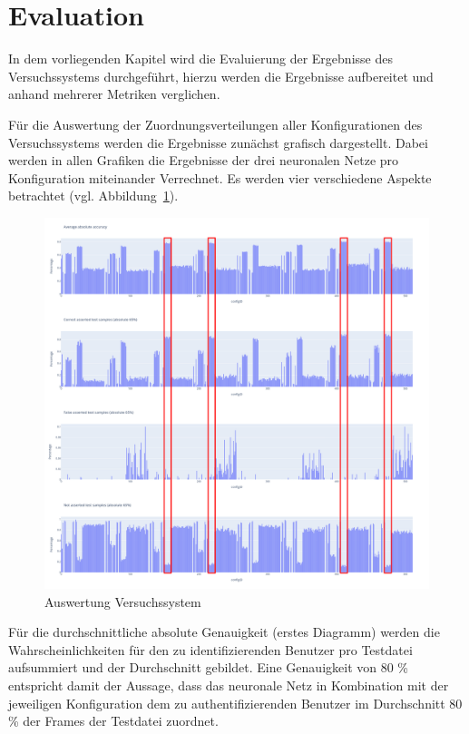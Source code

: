 \section{Evaluation} \label{sec:Evaluation}
In dem vorliegenden Kapitel wird die Evaluierung der Ergebnisse des Versuchssystems durchgeführt, hierzu werden die Ergebnisse aufbereitet und anhand mehrerer Metriken verglichen.

Für die Auswertung der Zuordnungsverteilungen aller Konfigurationen des Versuchssystems werden die Ergebnisse zunächst grafisch dargestellt.
Dabei werden in allen Grafiken die Ergebnisse der drei neuronalen Netze pro Konfiguration miteinander Verrechnet.
Es werden vier verschiedene Aspekte betrachtet (vgl. Abbildung~\ref{fig:AuswertungVersuchssystem}).
\begin{figure}[H]
    \centering
    \includegraphics[width=1\textwidth, keepaspectratio]{images/Auswertung.png}
    \caption{Auswertung Versuchssystem}
    \label{fig:AuswertungVersuchssystem}
\end{figure}

Für die durchschnittliche absolute Genauigkeit (erstes Diagramm) werden die Wahrscheinlichkeiten für den zu identifizierenden Benutzer pro Testdatei aufsummiert und der Durchschnitt gebildet.
Eine Genauigkeit von 80 \% entspricht damit der Aussage, dass das neuronale Netz in Kombination mit der jeweiligen Konfiguration dem zu authentifizierenden Benutzer im Durchschnitt 80 \% der Frames der Testdatei zuordnet.

